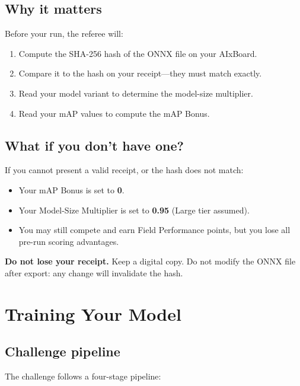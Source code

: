 \documentclass[a4]{article}
\begin{document}
\subsection*{Why it matters}

Before your run, the referee will:
\begin{enumerate}
    \item Compute the SHA-256 hash of the ONNX file on your AIxBoard.
    \item Compare it to the hash on your receipt---they must match exactly.
    \item Read your model variant to determine the model-size multiplier.
    \item Read your mAP values to compute the mAP Bonus.
\end{enumerate}

\subsection*{What if you don't have one?}

If you cannot present a valid receipt, or the hash does not match:
\begin{itemize}
    \item Your mAP Bonus is set to \textbf{0}.
    \item Your Model-Size Multiplier is set to \textbf{0.95} (Large tier assumed).
    \item You may still compete and earn Field Performance points, but you lose all pre-run scoring advantages.
\end{itemize}

\begin{framed}
\textbf{Do not lose your receipt.} Keep a digital copy. Do not modify the ONNX file after export: any change will invalidate the hash.
\end{framed}

\pagebreak
\section{Training Your Model}

\subsection*{Challenge pipeline}

The challenge follows a four-stage pipeline:
\end{document}
